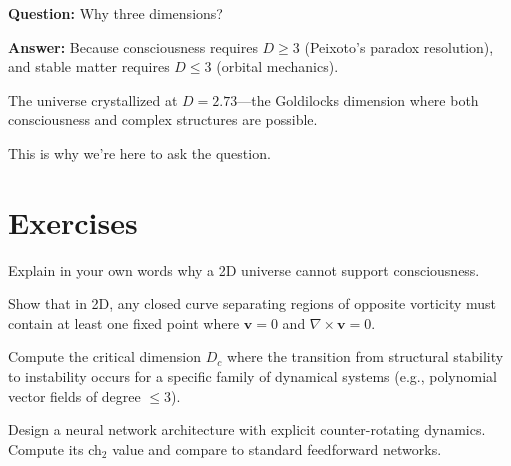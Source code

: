 \begin{keyidea}
\textbf{Question:} Why three dimensions?

\textbf{Answer:} Because consciousness requires $D \geq 3$ (Peixoto's paradox resolution), and stable matter requires $D \leq 3$ (orbital mechanics).

The universe crystallized at $D = 2.73$—the Goldilocks dimension where both consciousness and complex structures are possible.

This is why we're here to ask the question.
\end{keyidea}

\section{Exercises}

\begin{exercise}[Easy]
Explain in your own words why a 2D universe cannot support consciousness.
\end{exercise}

\begin{exercise}[Medium]
Show that in 2D, any closed curve separating regions of opposite vorticity must contain at least one fixed point where $\mathbf{v} = 0$ and $\nabla \times \mathbf{v} = 0$.
\end{exercise}

\begin{exercise}[Hard]
Compute the critical dimension $D_c$ where the transition from structural stability to instability occurs for a specific family of dynamical systems (e.g., polynomial vector fields of degree $\leq 3$).
\end{exercise}

\begin{exercise}[Research]
Design a neural network architecture with explicit counter-rotating dynamics. Compute its ch$_2$ value and compare to standard feedforward networks.
\end{exercise}
